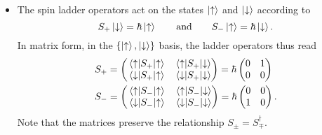 \documentclass[11pt, a4paper]{article}
\newcommand{\eqtext}[1]{\qquad \text{#1} \qquad}
\newcommand{\ua}{\uparrow}  %
\newcommand{\da}{\downarrow}  %
\begin{document}
\begin{itemize}
	\item The spin ladder operators act on the states $ \ket{\ua} $ and $ \ket{\da} $ according to
	\begin{equation*}
		S_{+}\ket{\da} = \hbar \ket{\ua} \eqtext{and} S_{-}\ket{\ua} = \hbar \ket{\da}.
	\end{equation*}
	In matrix form, in the $ \{\ket{\ua}, \ket{\da}\} $ basis, the ladder operators thus read
	\begin{align*}
		&S_{+} = 
		\begin{pmatrix}
			\mel{\ua}{S_{+}}{\ua} & \mel{\ua}{S_{+}}{\da}\\
			\mel{\da}{S_{+}}{\ua} & \mel{\da}{S_{+}}{\da}
		\end{pmatrix}
		= \hbar
		\begin{pmatrix}
			0 & 1\\
			0 & 0
		\end{pmatrix}\\
		&S_{-} = 
		\begin{pmatrix}
			\mel{\ua}{S_{-}}{\ua} & \mel{\ua}{S_{-}}{\da}\\
			\mel{\da}{S_{-}}{\ua} & \mel{\da}{S_{-}}{\da}
		\end{pmatrix}
		= \hbar
		\begin{pmatrix}
			0 & 0 \\
			1 & 0
		\end{pmatrix}.
	\end{align*}
	Note that the matrices preserve the relationship $ S_{\pm} = S_{\mp}^{\dagger} $.
	

\end{itemize}
\end{document}
